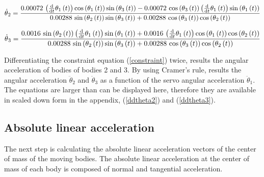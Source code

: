 \begin{equation}\label{dtheta2}
\dot{\theta}{_2} =	{\frac { 0.00072\, \left( {\frac {\rm d}{{\rm d}t}}\theta_{{1}}
 \left( t \right)  \right) \cos \left( \theta_{{1}} \left( t \right) 
 \right) \sin \left( \theta_{{3}} \left( t \right)  \right) - 0.00072
\,\cos \left( \theta_{{3}} \left( t \right)  \right)  \left( {\frac 
{\rm d}{{\rm d}t}}\theta_{{1}} \left( t \right)  \right) \sin \left( 
\theta_{{1}} \left( t \right)  \right) }{ 0.00288\,\sin \left( \theta_
{{2}} \left( t \right)  \right) \sin \left( \theta_{{3}} \left( t
 \right)  \right) + 0.00288\,\cos \left( \theta_{{3}} \left( t
 \right)  \right) \cos \left( \theta_{{2}} \left( t \right)  \right) }
}
\end{equation}

\begin{equation}\label{dtheta3}
\dot{\theta}{_3} =	{\frac { 0.0016\,\sin \left( \theta_{{2}} \left( t \right)  \right) 
 \left( {\frac {\rm d}{{\rm d}t}}\theta_{{1}} \left( t \right) 
 \right) \sin \left( \theta_{{1}} \left( t \right)  \right) + 0.0016\,
 \left( {\frac {\rm d}{{\rm d}t}}\theta_{{1}} \left( t \right) 
 \right) \cos \left( \theta_{{1}} \left( t \right)  \right) \cos
 \left( \theta_{{2}} \left( t \right)  \right) }{ 0.00288\,\sin
 \left( \theta_{{2}} \left( t \right)  \right) \sin \left( \theta_{{3}
} \left( t \right)  \right) + 0.00288\,\cos \left( \theta_{{3}}
 \left( t \right)  \right) \cos \left( \theta_{{2}} \left( t \right) 
 \right) }}
\end{equation}

Differentiating the constraint equation (\ref{constraint}) twice, results the angular acceleration of bodies of bodies 2 and 3. By using Cramer's rule, results the angular acceleration $\ddot{\theta}{_2}$ and $\ddot{\theta}{_3}$ as a function of the servo angular acceleration $\ddot{\theta}{_1}$. The equations are larger than can be displayed here, therefore they are available in scaled down form in the appendix,  (\ref{ddtheta2}) and  (\ref{ddtheta3}).

\subsection{Absolute linear acceleration}


The next step is calculating the absolute linear acceleration vectors of the center of mass of the moving bodies. The absolute linear acceleration at the center of mass of each body is composed of normal and tangential acceleration. 

